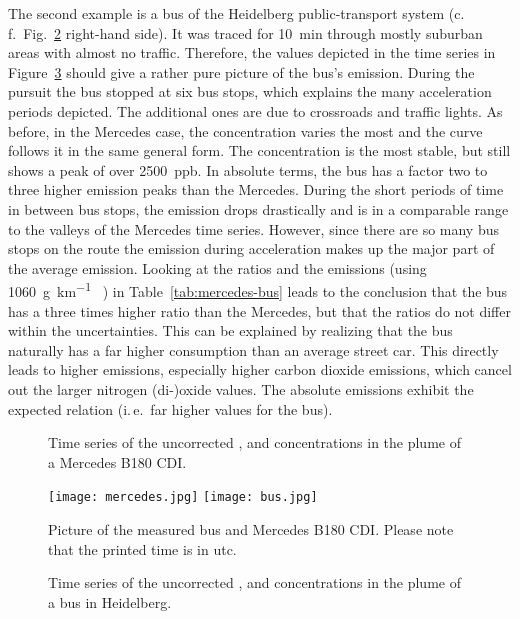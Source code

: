 The second example is a bus of the Heidelberg public-transport system
(c.\,f.\ Fig.~\ref{fig:bus} right-hand side). It was traced for
\SI{10}{\minute} through mostly suburban areas with almost no
traffic. Therefore, the values depicted in the time series in
Figure~\ref{fig:bus-ts} should give a rather pure picture of the bus's
emission. During the pursuit the bus stopped at six bus stops, which
explains the many acceleration periods depicted. The additional ones
are due to crossroads and traffic lights. As before, in the Mercedes
case, the  concentration varies the most and the 
curve follows it in the same general form. The  concentration
is the most stable, but still shows a peak of over \SI{2500}{ppb}. In
absolute terms, the bus has a factor two to three higher 
emission peaks than the Mercedes. During the short periods of time in
between bus stops, the emission drops drastically and is in a
comparable range to the valleys of the Mercedes time series. However,
since there are so many bus stops on the route the emission during
acceleration makes up the major part of the average emission. Looking
at the ratios and the emissions (using \SI{1060}{\gram\per\kilo\meter}
~\cite{denis}) in Table~\ref{tab:mercedes-bus} leads to the
conclusion that the bus has a three times higher  ratio than
the Mercedes, but that the  ratios do not differ within the
uncertainties. This can be explained by realizing that the bus
naturally has a far higher consumption than an average street
car. This directly leads to higher emissions, especially higher carbon
dioxide emissions, which cancel out the larger nitrogen (di-)oxide
values. The absolute emissions exhibit the expected relation (i.\,e.\
far higher values for the bus).
\begin{figure}[htbp]
  \centering
  
  \caption{Time series of the uncorrected ,  and
    \ch{CO2} concentrations in the plume of a Mercedes B180 CDI.}
  \label{fig:mercedes-ts}
\end{figure}

\begin{figure}[htbp]
  \centering
  \texttt{[image: mercedes.jpg]}
  \hfill  
  \texttt{[image: bus.jpg]}
  \caption{Picture of the measured bus and Mercedes B180 CDI. Please note that
    the printed time is in utc.}
  \label{fig:bus}
\end{figure}

\begin{figure}[htbp]
  \centering
  
  \caption{Time series of the uncorrected ,  and 
    concentrations in the plume of a bus in Heidelberg.}
  \label{fig:bus-ts}
\end{figure}

